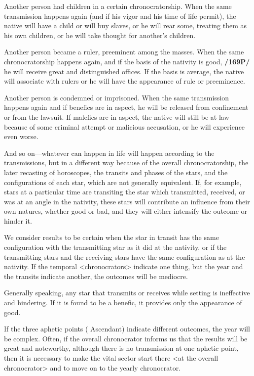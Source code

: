 Another person had children in a certain chronocratorship. When the same transmission happens again (and if his vigor and his time of life permit), the native will have a child or will buy slaves, or he will rear some, treating them as his own children, or he will take thought for another’s children.

Another person became a ruler, preeminent among the masses. When the same chronocratorship happens again, and if the basis of the nativity is good, \textbf{/169P/} he will receive great and distinguished offices. If the basis is average, the native will associate with rulers or he will have the appearance of rule or preeminence.

Another person is condemned or imprisoned. When the same transmission happens again and if benefics are in aspect, he will be released from confinement or from the lawsuit. If malefics are in aspect, the native will still be at law because of some criminal attempt or malicious accusation, or he will experience even worse.

And \mndl so on—whatever can happen in life will happen according to the transmissions, but in a different way because of the overall chronocratorship, the later recasting of horoscopes, the transits and phases of the stars, and the configurations of each star, which are not generally equivalent. If, for example, stars at a particular time are transiting the star which transmitted, received, or was at an angle in the nativity, these stars will contribute an influence from their own natures, whether good or bad, and they will either intensify the outcome or hinder it. 

We consider results to be certain when the star in transit has the same configuration with the transmitting star as it did at the nativity, or if the transmitting stars and the receiving stars have the same configuration as at the nativity. If the temporal <chronocrators> indicate one thing, but the year and the transits indicate another, the outcomes will be mediocre. 

Generally \mndl speaking, any star that transmits or receives while setting is ineffective and hindering. If it is found to be a benefic, it provides only the appearance of good. 

If the three aphetic points (\Sun\xspace \Moon\xspace Ascendant) indicate different outcomes, the year will be complex. Often, if the overall chronocrator informs us that the results will be great and noteworthy, although there is no transmission at one aphetic point, then it is necessary to make the vital sector start there <at the overall chronocrator> and to move on to the yearly chronocrator.

